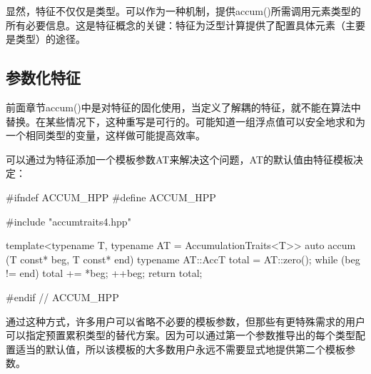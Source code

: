 显然，特征不仅仅是类型。可以作为一种机制，提供accum()所需调用元素类型的所有必要信息。这是特征概念的关键：特征为泛型计算提供了配置具体元素（主要是类型）的途径。

\subsection{参数化特征}

前面章节accum()中是对特征的固化使用，当定义了解耦的特征，就不能在算法中替换。在某些情况下，这种重写是可行的。可能知道一组浮点值可以安全地求和为一个相同类型的变量，这样做可能提高效率。

可以通过为特征添加一个模板参数AT来解决这个问题，AT的默认值由特征模板决定：

\begin{cpp}
#ifndef ACCUM_HPP
#define ACCUM_HPP

#include "accumtraits4.hpp"

template<typename T, typename AT = AccumulationTraits<T>>
auto accum (T const* beg, T const* end) {
	typename AT::AccT total = AT::zero();
	while (beg != end) {
		total += *beg;
		++beg;
	}
	return total;
}

#endif // ACCUM_HPP
\end{cpp}

通过这种方式，许多用户可以省略不必要的模板参数，但那些有更特殊需求的用户可以指定预置累积类型的替代方案。因为可以通过第一个参数推导出的每个类型配置适当的默认值，所以该模板的大多数用户永远不需要显式地提供第二个模板参数。










